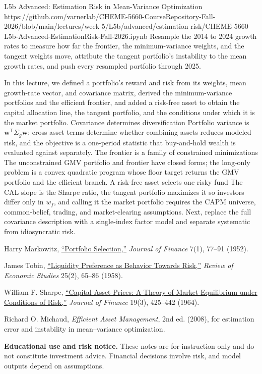 \documentclass[11pt]{article}
\begin{document}
\notebooklink
  {L5b Advanced: Estimation Risk in Mean-Variance Optimization}
  {https://github.com/varnerlab/CHEME-5660-CourseRepository-Fall-2026/blob/main/lectures/week-5/L5b/advanced/estimation-risk/CHEME-5660-L5b-Advanced-EstimationRisk-Fall-2026.ipynb}
  {Resample the 2014 to 2024 growth rates to measure how far the frontier, the minimum-variance weights, and the tangent weights move, attribute the tangent portfolio's instability to the mean growth rates, and push every resampled portfolio through 2025.}

\newpage
\thispagestyle{fancy}
\keytakeaways
  {In this lecture, we defined a portfolio's reward and risk from its weights, mean growth-rate vector, and covariance matrix, derived the minimum-variance portfolios and the efficient frontier, and added a risk-free asset to obtain the capital allocation line, the tangent portfolio, and the conditions under which it is the market portfolio.}
  {Covariance determines diversification}
  {Portfolio variance is $\mathbf w^{\mathsf T}\Sigma_g\mathbf w$; cross-asset terms determine whether combining assets reduces modeled risk, and the objective is a one-period statistic that buy-and-hold wealth is evaluated against separately.}
  {The frontier is a family of constrained minimizations}
  {The unconstrained GMV portfolio and frontier have closed forms; the long-only problem is a convex quadratic program whose floor target returns the GMV portfolio and the efficient branch.}
  {A risk-free asset selects one risky fund}
  {The CAL slope is the Sharpe ratio, the tangent portfolio maximizes it so investors differ only in $w_f$, and calling it the market portfolio requires the CAPM universe, common-belief, trading, and market-clearing assumptions.}
  {Next, replace the full covariance description with a single-index factor model and separate systematic from idiosyncratic risk.}

\begin{readinglist}
  \item Harry Markowitz, \href{https://www.jstor.org/stable/2975974}{``Portfolio Selection,''} \emph{Journal of Finance} 7(1), 77--91 (1952).
  \item James Tobin, \href{https://doi.org/10.2307/2296205}{``Liquidity Preference as Behavior Towards Risk,''} \emph{Review of Economic Studies} 25(2), 65--86 (1958).
  \item William F. Sharpe, \href{https://www.jstor.org/stable/2977928}{``Capital Asset Prices: A Theory of Market Equilibrium under Conditions of Risk,''} \emph{Journal of Finance} 19(3), 425--442 (1964).
  \item Richard O. Michaud, \emph{Efficient Asset Management}, 2nd ed. (2008), for estimation error and instability in mean--variance optimization.
\end{readinglist}

\vfill
{\sffamily\footnotesize\color{vnmuted}\textbf{Educational use and risk notice.} These notes are for instruction only and do not constitute investment advice. Financial decisions involve risk, and model outputs depend on assumptions.}
\end{document}
